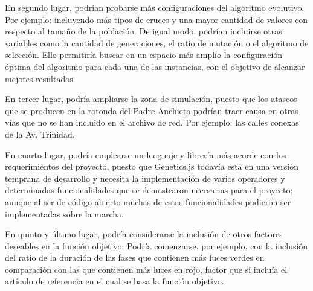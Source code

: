 En segundo lugar, podrían probarse más configuraciones del algoritmo evolutivo. Por ejemplo: incluyendo más tipos de cruces y una mayor cantidad de valores con respecto al tamaño de la población. De igual modo, podrían incluirse otras variables como la cantidad de generaciones, el ratio de mutación o el algoritmo de selección. Ello permitiría buscar en un espacio más amplio la configuración óptima del algoritmo para cada una de las instancias, con el objetivo de alcanzar mejores resultados.

En tercer lugar, podría ampliarse la zona de simulación, puesto que los atascos que se producen en la rotonda del Padre Anchieta podrían traer causa en otras vías que no se han incluido en el archivo de red. Por ejemplo: las calles conexas de la Av. Trinidad.

En cuarto lugar, podría emplearse un lenguaje y librería más acorde con los requerimientos del proyecto, puesto que Genetics.js todavía está en una versión temprana de desarrollo y necesita la implementación de varios operadores y determinadas funcionalidades que se demostraron necesarias para el proyecto; aunque al ser de código abierto muchas de estas funcionalidades pudieron ser implementadas sobre la marcha.

En quinto y último lugar, podría considerarse la inclusión de otros factores deseables en la función objetivo. Podría comenzarse, por ejemplo, con la inclusión del ratio de la duración de las fases que contienen más luces verdes en comparación con las que contienen más luces en rojo, factor que sí incluía el artículo de referencia en el cual se basa la función objetivo.
